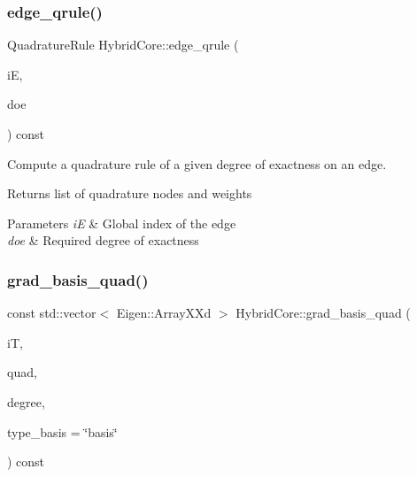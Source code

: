 \subsubsection{\texorpdfstring{edge\+\_\+qrule()}{edge\_qrule()}}
{\footnotesize\ttfamily Quadrature\+Rule Hybrid\+Core\+::edge\+\_\+qrule (\begin{DoxyParamCaption}\item[{const size\+\_\+t}]{iE,  }\item[{const size\+\_\+t}]{doe }\end{DoxyParamCaption}) const}



Compute a quadrature rule of a given degree of exactness on an edge. 

\begin{DoxyReturn}{Returns}
list of quadrature nodes and weights 
\end{DoxyReturn}

\begin{DoxyParams}{Parameters}
{\em iE} & Global index of the edge \\
\hline
{\em doe} & Required degree of exactness \\
\hline
\end{DoxyParams}
\mbox{\label{classHArDCore2D_1_1HybridCore_add794287f4bb49157a7b5f94a5ecb200}} 
\subsubsection{\texorpdfstring{grad\+\_\+basis\+\_\+quad()}{grad\_basis\_quad()}}
{\footnotesize\ttfamily const std\+::vector$<$ Eigen\+::\+Array\+X\+Xd $>$ Hybrid\+Core\+::grad\+\_\+basis\+\_\+quad (\begin{DoxyParamCaption}\item[{const size\+\_\+t}]{iT,  }\item[{const Quadrature\+Rule}]{quad,  }\item[{const size\+\_\+t}]{degree,  }\item[{const std\+::string}]{type\+\_\+basis = {\ttfamily \char`\"{}basis\char`\"{}} }\end{DoxyParamCaption}) const}



